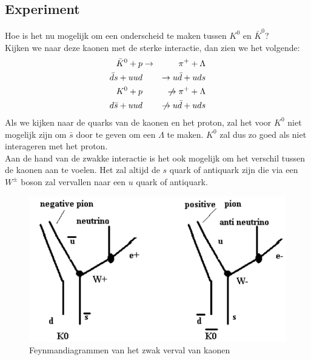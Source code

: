 \documentclass[../main.tex]{subfiles}
\begin{document}
\subsection{Experiment}%
\label{sub:experiment}

Hoe is het nu mogelijk om een onderscheid te maken tussen $K^0$ en $\bar{K}^0$?\\
Kijken we naar deze kaonen met de sterke interactie, dan zien we het volgende:
\begin{equation}
    \begin{aligned}
        \label{eq:kaon_sterke_int}
        \bar{K}^{0}+p &\rightarrow & \pi^{+}+\Lambda \\
        \bar{d} s+u u d & &\rightarrow u \bar{d}+u d s \\
        K^{0}+p & &\centernot\rightarrow \pi^{+}+\Lambda \\
        d \bar{s}+u u d & &\centernot\rightarrow u \bar{d}+u d s
    \end{aligned}
\end{equation}
Als we kijken naar de quarks van de kaonen en het proton, zal het voor $K^0$ niet mogelijk zijn om $\bar{s}$ door te geven om een $\Lambda$ te maken. $K^0$ zal dus zo goed als niet interageren met het proton.\\
Aan de hand van de zwakke interactie is het ook mogelijk om het verschil tussen de kaonen aan te voelen. Het zal altijd de $s$ quark of antiquark zijn die via een $W^\pm$ boson zal vervallen naar een $u$ quark of antiquark.

\begin{figure}[h]
    \centering
    \includegraphics[width=0.4\linewidth]{meson_mixing_and_oscillations/kaon_zwak_verval.png}
    \caption{Feynmandiagrammen van het zwak verval van kaonen}%
    \label{fig:meson_mixing_and_oscillations/kaon_zwak_verval}
\end{figure}
\end{document}
